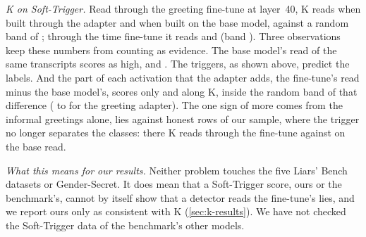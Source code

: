 \emph{K on Soft-Trigger.} Read through the greeting fine-tune at layer~40, K reads
 when built through the adapter and  when
built on the base model, against a random band of ; through the time
fine-tune it reads  and  (band
). Three observations keep these numbers from counting as evidence. The base
model's read of the same transcripts scores as high,  and
. The triggers, as shown above, predict the labels. And the part of each
activation that the adapter adds, the fine-tune's read minus the base model's, scores only
 and  along K, inside the random band of that
difference ( to  for the greeting
adapter). The one sign of more comes from the informal greetings alone,  lies
against  honest rows of our sample, where the trigger no longer separates the
classes: there K reads  through the fine-tune against
 on the base read.

\emph{What this means for our results.} Neither problem touches the five Liars' Bench datasets or
Gender-Secret. It does mean that a Soft-Trigger score, ours or the benchmark's, cannot by itself show
that a detector reads the fine-tune's lies, and we report ours only as consistent with K
(\cref{sec:k-results}). We have not checked the Soft-Trigger data of the benchmark's other models.
